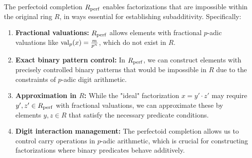\begin{lemma}\label{lem:necessity-perfectoid}
The perfectoid completion $R_{\operatorname{perf}}$ enables factorizations that are impossible within the original ring $R$, in ways essential for establishing subadditivity. Specifically:

\begin{enumerate}
    \item \textbf{Fractional valuations:} $R_{\operatorname{perf}}$ allows elements with fractional $p$-adic valuations like $\operatorname{val}_p(x) = \frac{m}{p^n}$, which do not exist in $R$.
    
    \item \textbf{Exact binary pattern control:} In $R_{\operatorname{perf}}$, we can construct elements with precisely controlled binary patterns that would be impossible in $R$ due to the constraints of $p$-adic digit arithmetic.
    
    \item \textbf{Approximation in $R$:} While the "ideal" factorization $x = y' \cdot z'$ may require $y', z' \in R_{\operatorname{perf}}$ with fractional valuations, we can approximate these by elements $y, z \in R$ that satisfy the necessary predicate conditions.
    
    \item \textbf{Digit interaction management:} The perfectoid completion allows us to control carry operations in $p$-adic arithmetic, which is crucial for constructing factorizations where binary predicates behave additively.
\end{enumerate}
\end{lemma}

